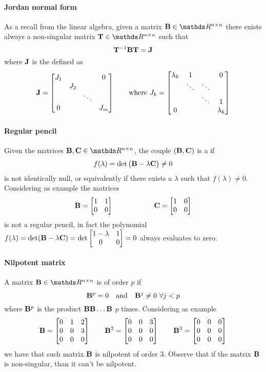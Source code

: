 	\paragraph{Jordan normal form} As a recall from the linear algebra, given a matrix $\mat B \in \mathds R^{n\times n}$ there exists always a non-singular matrix $\mat T \in \mathds R^{n\times n}$ such that 
	\[ \mathbf{T}^{-1} \mathbf{B} \mathbf{T}= \mathbf{J}\]
	where $\mathbf{J}$ is the  defined as 
	\begin{equation}
		\mathbf{J} = \begin{bmatrix} J_1 &&& 0 \\ & J_2 \\ && \ddots \\ 0 &&& J_m \end{bmatrix} \qquad \textrm{where } J_k = \begin{bmatrix}  \lambda_k & 1 & & 0 \\ & \ddots & \ddots \\
		&& \ddots & 1 \\ 0 &&& \lambda_k  \end{bmatrix}
	\end{equation}

	\paragraph{Regular pencil} Given the matrices $\mat B, \mat C \in \mathds R^{n\times n} $, the couple  $(\mathbf{B},\mathbf{C})$ is a  if 
	\[ f(\lambda) = \det\big( \mathbf{B} - \lambda \mathbf{C} \big) \neq 0 \]
	is not identically null, or equivalently if there exists a $\lambda$ such that $f(\lambda) \neq 0$. Considering as example the matrices 
	\[ \mathbf{B} = \begin{bmatrix} 1 & 1 \\ 0 & 0 \end{bmatrix} \hspace{2cm} \mathbf{C} = \begin{bmatrix} 1 & 0 \\ 0 & 0  \end{bmatrix} \]
	is not a regular pencil, in fact the polynomial $f(\lambda) = \det(\mathbf{B} - \lambda \mathbf{C}) = \det \begin{bmatrix} 1-\lambda & 1 \\  0 & 0  \end{bmatrix} = 0$ always evaluates to zero. 
	
	\paragraph{Nilpotent matrix} A matrix $\mat B \in \mathds R^{n\times n}$ is  of order $p$ if
	\begin{equation}
		\mathbf{B}^p = 0 \quad\textrm{and} \quad \mathbf{B}^j \neq 0 \ \forall j < p 	
	\end{equation}
	where $\mathbf{B}^p$ is the product $\mathbf{B} \mathbf{B}\dots \mathbf{B}$ $p$ times. Considering as example
	\[ \mathbf{B} = \begin{bmatrix} 0 & 1 & 2 \\ 0 & 0 & 3 \\ 0 & 0 & 0 \end{bmatrix} \qquad \mathbf{B}^2 = \begin{bmatrix}  0 & 0 & 3 \\ 0 & 0 & 0 \\ 0 & 0 & 0  \end{bmatrix} \qquad \mathbf{B}^3 = \begin{bmatrix}  0 & 0 & 0 \\ 0 & 0 & 0 \\ 0 & 0 & 0  \end{bmatrix} \]
	we have that such matrix $\mathbf{B}$ is nilpotent of order 3. Observe that if the matrix $\mathbf{B}$ is non-singular, than it can't be nilpotent.
	
